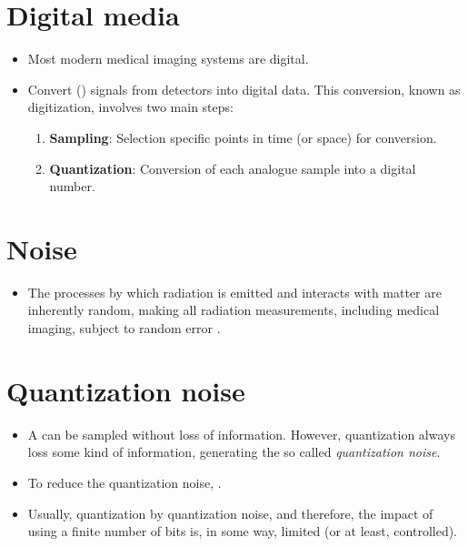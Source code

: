 \section{Digital media}
\begin{itemize}
\item Most modern medical imaging systems are digital.
\item Convert  () signals from detectors into
  digital data. This conversion, known as digitization, involves two
  main steps:
  \begin{enumerate}
  \item \textbf{Sampling}: Selection specific points in time (or
    space) for conversion.
  \item \textbf{Quantization}: Conversion of each analogue sample into a
    digital number.
  \end{enumerate}
\end{itemize}

\section{Noise}
\begin{itemize}
\item The processes by which radiation is emitted and interacts with
  matter are inherently random, making all radiation measurements,
  including medical imaging, subject to random error
  \cite{bushberg2011essential}.
\end{itemize}

\section{Quantization noise}
\begin{itemize}
\item A  can be sampled without
  loss of information. However, quantization always loss some kind of
  information, generating the so called \emph{quantization noise}.
\item To reduce the quantization noise,  \cite{bushberg2011essential}.
\item Usually, quantization  by quantization noise, and therefore,
  the impact of using a finite number of bits is, in some way, limited
  (or at least, controlled).
\end{itemize}
